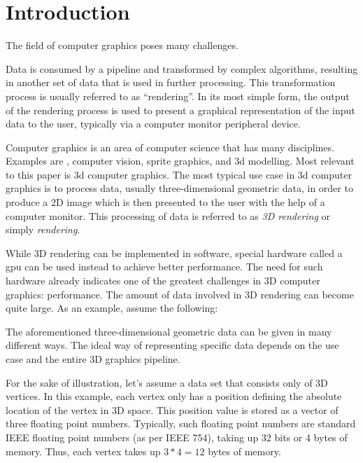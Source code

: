 
\chapter{Introduction}
\label{cha:Introduction}

  The field of computer graphics poses many challenges.

  Data is consumed by a pipeline and transformed by complex algorithms, resulting in another set of data that is used in further processing. This transformation process is usually referred to as ``rendering''. In its most simple form, the output of the rendering process is used to present a graphical representation of the input data to the user, typically via a computer monitor peripheral device.

  Computer graphics is an area of computer science that has many disciplines. Examples are , computer vision, sprite graphics, and \acrshort{3d} modelling. Most relevant to this paper is \acrfull{3d} computer graphics.  The most typical use case in \acrshort{3d} computer graphics is to process data, usually three-dimensional geometric data, in order to produce a 2D image which is then presented to the user with the help of a computer monitor. This processing of data is referred to as \textit{3D rendering} or simply \textit{rendering}.

  While 3D rendering can be implemented in software, special hardware called a \acrfull{gpu} can be used instead to achieve better performance. The need for such hardware already indicates one of the greatest challenges in 3D computer graphics: performance. The amount of data involved in 3D rendering can become quite large. As an example, assume the following:


  The aforementioned three-dimensional geometric data can be given in many different ways. The ideal way of representing specific data depends on the use case and the entire 3D graphics pipeline.

  For the sake of illustration, let's assume a data set that consists only of 3D vertices. In this example, each vertex only has a position defining the absolute location of the vertex in 3D space. This position value is stored as a vector of three floating point numbers. Typically, such floating point numbers are standard IEEE floating point numbers (as per IEEE 754), taking up 32 bits or 4 bytes of memory. Thus, each vertex takes up $3*4 = 12$ bytes of memory.

